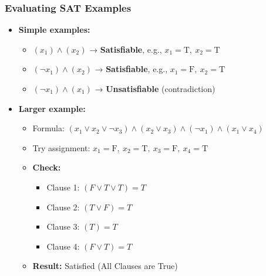\documentclass[10pt,aspectratio=43]{beamer}
\begin{document}
\begin{frame}
    \frametitle{Evaluating SAT Examples}

    \begin{itemize}
        \item \textbf{Simple examples:}
        \begin{itemize}
            \item $(x_1) \land (x_2)$ → \textbf{Satisfiable}, e.g., $x_1 = \text{T},\ x_2 = \text{T}$
            \item $(\lnot x_1) \land (x_2)$ → \textbf{Satisfiable}, e.g., $x_1 = \text{F},\ x_2 = \text{T}$
            \item $(\lnot x_1) \land (x_1)$ → \textbf{Unsatisfiable} (contradiction)
        \end{itemize}

        \vspace{0.5em}

        \item \textbf{Larger example:}
        \begin{itemize}
            \item Formula: $(x_1 \lor x_2 \lor \lnot x_3) \land (x_2 \lor x_3) \land (\lnot x_1) \land (x_1 \lor x_4)$
            \item Try assignment: $x_1 = \text{F},\ x_2 = \text{T},\ x_3 = \text{F},\ x_4 = \text{T}$
            \item \textbf{Check:} 
            \begin{itemize}
                \item Clause 1: $(F \lor T \lor T) = T$
                \item Clause 2: $(T \lor F) = T$
                \item Clause 3: $(T) = T$
                \item Clause 4: $(F \lor T) = T$
            \end{itemize}
            \item \textbf{Result:} Satisfied (All Clauses are True)
        \end{itemize}
    \end{itemize}
\end{frame}


\end{document}
